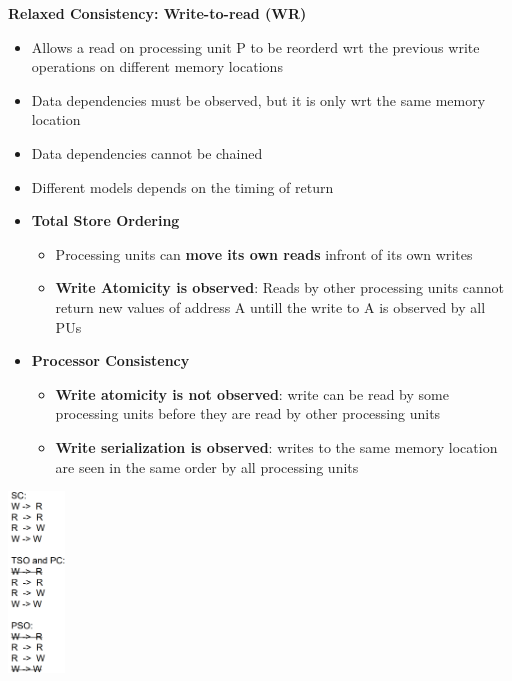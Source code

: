 \documentclass[10pt, landscape]{article}
\begin{document}
\begin{multicols}{4}
\textbf{Relaxed Consistency: Write-to-read (WR)}
\begin{itemize}
    \item Allows a read on processing unit P to be reorderd wrt the previous write operations on different memory locations 
    \item Data dependencies must be observed, but it is only wrt the same memory location
    \item Data dependencies cannot be chained
    \item Different models depends on the timing of return
    \item \textbf{Total Store Ordering}
    \begin{itemize}
        \item Processing units can \textbf{move its own reads} infront of its own writes 
        \item \textbf{Write Atomicity is observed}: Reads by other processing units cannot return new values of address A untill the write to A is observed by all PUs 
    \end{itemize}
    \item \textbf{Processor Consistency}
    \begin{itemize}
        \item \textbf{Write atomicity is not observed}: write can be read by some processing units before they are read by other processing units
        \item \textbf{Write serialization is observed}: writes to the same memory location are seen in the same order by all processing units
    \end{itemize}
\end{itemize}

\includegraphics*[width=1.5cm]{mem_order.png}


\end{multicols}
\end{document}
